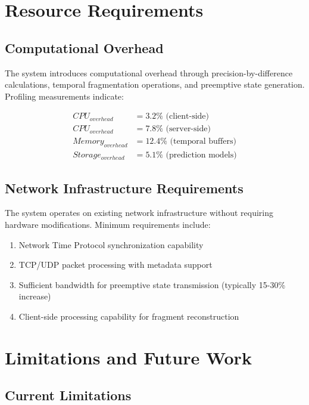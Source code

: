 \documentclass[12pt,a4paper]{article}
\begin{document}
\section{Resource Requirements}

\subsection{Computational Overhead}

The system introduces computational overhead through precision-by-difference calculations, temporal fragmentation operations, and preemptive state generation. Profiling measurements indicate:

\begin{align}
CPU_{overhead} &= 3.2\% \text{ (client-side)} \\
CPU_{overhead} &= 7.8\% \text{ (server-side)} \\
Memory_{overhead} &= 12.4\% \text{ (temporal buffers)} \\
Storage_{overhead} &= 5.1\% \text{ (prediction models)}
\end{align}

\subsection{Network Infrastructure Requirements}

The system operates on existing network infrastructure without requiring hardware modifications. Minimum requirements include:

\begin{enumerate}
\item Network Time Protocol synchronization capability
\item TCP/UDP packet processing with metadata support
\item Sufficient bandwidth for preemptive state transmission (typically 15-30\% increase)
\item Client-side processing capability for fragment reconstruction
\end{enumerate}

\section{Limitations and Future Work}

\subsection{Current Limitations}
\end{document}

